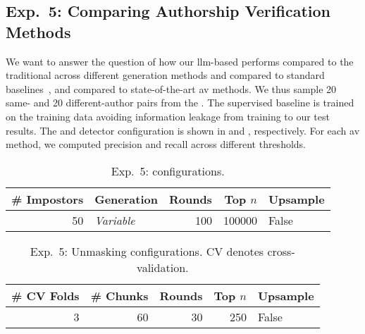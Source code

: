 \subsection{Exp.\ 5: Comparing Authorship Verification Methods}
\label{subsec:imp_gen_setup}

We want to answer the question of how our \ac{llm}-based \impAppr{} performs compared to the traditional \impAppr{} across different generation methods and compared to standard baselines~\citep{koppel_determining_2014}, and compared to state-of-the-art \ac{av} methods.
We thus sample 20 same- and 20 different-author pairs from the \dataStudent{}. %
The supervised baseline is trained on the training data avoiding information leakage from training to our test results.
The \impAppr{} and \unmasking{} detector configuration is shown in  and , respectively.
For each \ac{av} method, we computed precision and recall across different thresholds. 

\begin{table}[h]
\centering\small
\caption{Exp.\ 5: \impAppr{} configurations.}
\label{tab:exp5_imp_config}
\begin{tabular}{@{}rlrrl@{}}   %
\toprule
\# Impostors & Generation & Rounds & Top $n$ & Upsample \\
\midrule
50 & \textit{Variable} & 100 & \num{100000} & False \\
\bottomrule
\end{tabular}%
\end{table}

\begin{table}[h]
\centering\small
\caption[Exp.\ 5: Unmasking configurations]{Exp.\ 5: Unmasking configurations. CV denotes cross-validation.}
\label{tab:exp5_unmasking_config}
\begin{tabular}{@{}rrrrl@{}}   %
\toprule
\# CV Folds & \# Chunks & Rounds & Top $n$ & Upsample \\
\midrule
3 & 60 & 30 & \num{250} & False \\
\bottomrule
\end{tabular}%
\end{table}


